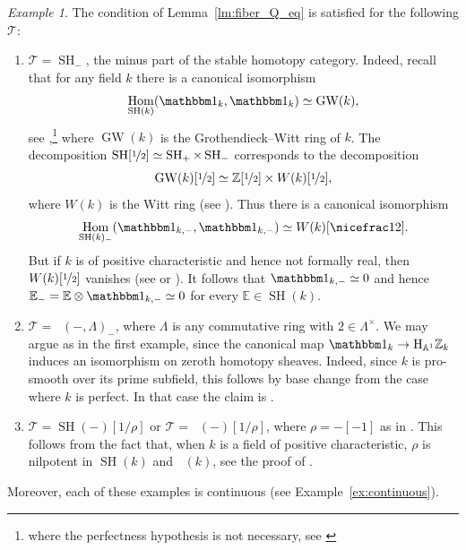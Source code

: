 \documentclass[JEP,XML,SOM,Unicode]{cedram}
\newcommand{\T}{\mathscr T}
\DeclareMathOperator{\GW}{GW}
\renewcommand{\AA}{\mathbb A}
\newcommand{\E}{\mathbb E}
\newcommand{\un}{\mathbbm 1}
\newcommand{\HA}{\mathrm H_{\AA^1}}
\DeclareMathOperator{\SH}{SH}
\DeclareMathOperator{\DA}{D_{\AA^1}}
\DeclareMathOperator{\Hom}{Hom}
\newcommand{\ZZ} {\mathbb Z}
\newcommand{\ZZot} {\mathbb Z[\nicefrac 1 2]}
\newcommand{\ot} {{\nicefrac 1 2}}
\theoremstyle{remark}
\newtheorem{ex}[thm]{Example}
\theoremstyle{definition}
\numberwithin{equation}{thm}
\begin{document}
\begin{ex}\label{ex:keylemma}
The condition of Lemma~\ref{lm:fiber_Q_eq} is satisfied for the following $\T$:
\begin{enumerate}
\item\label{item:keylemma/SHminus}
$\T=\SH_-$, the minus part of the stable homotopy category.
Indeed, recall that for any field $k$ there is a canonical isomorphism
\[\Hom_{\SH(k)}(\un_k,\un_k) \simeq \GW(k),\]
see \cite[Cor.\,1.25]{MorelA1},\footnote{where the perfectness hypothesis is not necessary, see \cite[Th.\,10.12]{BachmannHoyois}} where $\GW(k)$ is the Grothendieck--Witt ring of $k$.
The decom\-po\-sition $\SH[\ot] \simeq \SH_+ \times \SH_-$ corresponds to the decomposition
\[ \GW(k)[\ot] \simeq \ZZot \times W(k)[\ot], \]
where $W(k)$ is the Witt ring (see \cite[Eq.\,(3.1)]{MorelA1}).
Thus there is a canonical isomorphism
\[ \Hom_{\SH(k)_-}(\un_{k,-},\un_{k,-}) \simeq W(k)[\ot]. \]
But if $k$ is of positive characteristic and hence not formally real, then $W(k)[\ot]$ vanishes (see \eg \cite[\S31.A]{EKM} or \cite[Chap.\,VIII, Lem.\,3.4]{LamQuadratic}).
It follows that $\un_{k,-} \simeq 0$ and hence $\E_- = \E \otimes \un_{k,-} \simeq 0$ for every $\E \in \SH(k)$.

\item\label{item:keylemma/DAminus}
$\T=\DA(-, \Lambda)_-$, where $\Lambda$ is any commutative ring with $2 \in \Lambda^\times$.
We may argue as in the first example, since the canonical map $\un_k \to \HA \ZZ_k$ induces an isomorphism on zeroth homotopy sheaves.
Indeed, since $k$ is pro-smooth over its prime subfield, this follows by base change from the case where $k$ is perfect.
In that case the claim is \cite[Th.\,6.37]{MorelA1}.

\item\label{item:keylemma/SHrhoinv}
$\T=\SH(-)[1/\rho]$ or $\T=\DA(-)[1/\rho]$, where $\rho=-[-1]$ as in \cite[Cor.\,19]{Bachmann}.
This follows from the fact that, when $k$ is a field of positive characteristic, $\rho$ is nilpotent in $\SH(k)$ and $\DA(k)$, see the proof of \cite[Cor.\,32]{Bachmann}.
\end{enumerate}
Moreover, each of these examples is continuous (see Example~\ref{ex:continuous}).
\end{ex}
\end{document}
